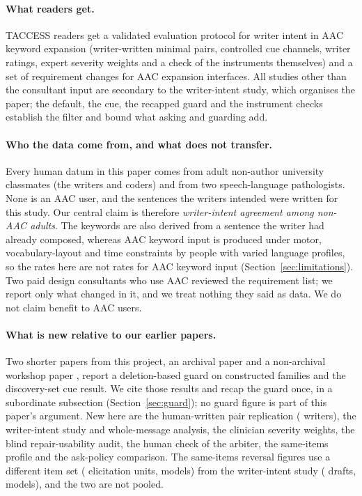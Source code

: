 \paragraph{What readers get.}
TACCESS readers get a validated evaluation protocol for writer intent in AAC keyword expansion (writer-written minimal pairs, controlled cue channels, writer ratings, expert severity weights and a check of the instruments themselves) and a set of requirement changes for AAC expansion interfaces. All studies other than the consultant input are secondary to the writer-intent study, which organises the paper; the default, the cue, the recapped guard and the instrument checks establish the filter and bound what asking and guarding add.

\paragraph{Who the data come from, and what does not transfer.}
Every human datum in this paper comes from adult non-author university classmates (the writers and coders) and from two speech-language pathologists. None is an AAC user, and the sentences the writers intended were written for this study. Our central claim is therefore \emph{writer-intent agreement among non-AAC adults}. The keywords are also derived from a sentence the writer had already composed, whereas AAC keyword input is produced under motor, vocabulary-layout and time constraints by people with varied language profiles, so the rates here are not rates for AAC keyword input (Section~\ref{sec:limitations}). Two paid design consultants who use AAC reviewed the requirement list; we report only what changed in it, and we treat nothing they said as data. We do not claim benefit to AAC users.

\paragraph{What is new relative to our earlier papers.}
Two shorter papers from this project, an archival paper and a non-archival workshop paper \cite{concurrent_se4all,concurrent_caleai}, report a deletion-based guard on constructed families and the discovery-set cue result. We cite those results and recap the guard once, in a subordinate subsection (Section~\ref{sec:guard}); no guard figure is part of this paper's argument. New here are the human-written pair replication (\jmhwWritersTotal{} writers), the writer-intent study and whole-message analysis, the clinician severity weights, the blind repair-usability audit, the human check of the arbiter, the same-items profile and the ask-policy comparison. The same-items reversal figures use a different item set (\jmfOneUnits{} elicitation units, \jmfOneModels{} models) from the writer-intent study (\jmpOneEightAcceptN{} drafts, \jmwmModels{} models), and the two are not pooled.

